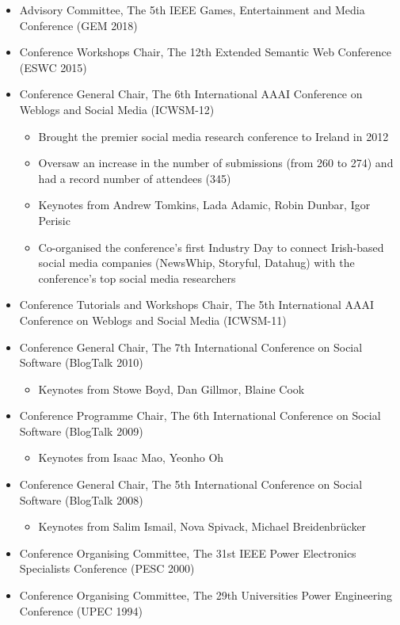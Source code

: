 \documentclass[10pt,a4paper]{res} %
\begin{document}
\begin{resume}
\begin{itemize} \itemsep -2pt
\item Advisory Committee, The 5th IEEE Games, Entertainment and Media Conference (GEM 2018)
\item Conference Workshops Chair, The 12th Extended Semantic Web Conference (ESWC 2015)
\item Conference General Chair, The 6th International AAAI Conference on Weblogs and Social Media (ICWSM-12)
\begin{itemize} \itemsep -2pt
\item Brought the premier social media research conference to Ireland in 2012
\item Oversaw an increase in the number of submissions (from 260 to 274) and had a record number of attendees (345)
\item Keynotes from Andrew Tomkins, Lada Adamic, Robin Dunbar, Igor Perisic
\item Co-organised the conference's first Industry Day to connect Irish-based social media companies (NewsWhip, Storyful, Datahug) with the conference's top social media researchers
\end{itemize}
\item Conference Tutorials and Workshops Chair, The 5th International AAAI Conference on Weblogs and Social Media (ICWSM-11)
\item Conference General Chair, The 7th International Conference on Social Software (BlogTalk 2010)
\begin{itemize} \itemsep -2pt
\item Keynotes from Stowe Boyd, Dan Gillmor, Blaine Cook
\end{itemize}
\item Conference Programme Chair, The 6th International Conference on Social Software (BlogTalk 2009)
\begin{itemize} \itemsep -2pt
\item Keynotes from Isaac Mao, Yeonho Oh
\end{itemize}
\item Conference General Chair, The 5th International Conference on Social Software (BlogTalk 2008)
\begin{itemize} \itemsep -2pt
\item Keynotes from Salim Ismail, Nova Spivack, Michael Breidenbr\"{u}cker
\end{itemize}
\item Conference Organising Committee, The 31st IEEE Power Electronics Specialists Conference (PESC 2000)
\item Conference Organising Committee, The 29th Universities Power Engineering Conference (UPEC 1994)
\end{itemize}


\end{resume}
\end{document}
